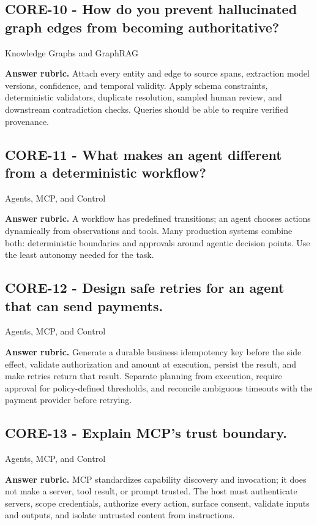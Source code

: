 \subsection*{CORE-10 - How do you prevent hallucinated graph edges from becoming authoritative?}
 \quad Knowledge Graphs and GraphRAG
\par\smallskip\textbf{Answer rubric.} Attach every entity and edge to source spans, extraction model versions, confidence, and temporal validity. Apply schema constraints, deterministic validators, duplicate resolution, sampled human review, and downstream contradiction checks. Queries should be able to require verified provenance.
\subsection*{CORE-11 - What makes an agent different from a deterministic workflow?}
 \quad Agents, MCP, and Control
\par\smallskip\textbf{Answer rubric.} A workflow has predefined transitions; an agent chooses actions dynamically from observations and tools. Many production systems combine both: deterministic boundaries and approvals around agentic decision points. Use the least autonomy needed for the task.
\subsection*{CORE-12 - Design safe retries for an agent that can send payments.}
 \quad Agents, MCP, and Control
\par\smallskip\textbf{Answer rubric.} Generate a durable business idempotency key before the side effect, validate authorization and amount at execution, persist the result, and make retries return that result. Separate planning from execution, require approval for policy-defined thresholds, and reconcile ambiguous timeouts with the payment provider before retrying.
\subsection*{CORE-13 - Explain MCP's trust boundary.}
 \quad Agents, MCP, and Control
\par\smallskip\textbf{Answer rubric.} MCP standardizes capability discovery and invocation; it does not make a server, tool result, or prompt trusted. The host must authenticate servers, scope credentials, authorize every action, surface consent, validate inputs and outputs, and isolate untrusted content from instructions.
